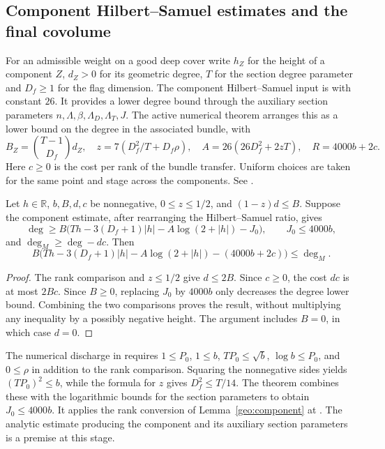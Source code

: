 \subsection{Component Hilbert--Samuel estimates and the final covolume}

For an admissible weight on a good deep cover write \(h_Z\) for the height of a component \(Z\), \(d_Z>0\) for its geometric degree, \(T\) for the section degree parameter and \(D_f\ge1\) for the flag dimension. The component Hilbert--Samuel input is  with constant \(26\). It provides a lower degree bound through the auxiliary section parameters \(n,\Lambda,\beta,\Lambda_D,\Lambda_T,J\). The active numerical theorem arranges this as a lower bound on the degree in the associated bundle, with
\[
 B_Z=\binom{T-1}{D_f}d_Z,\quad
 z=7(D_f^2/T+D_f\rho),\quad
 A=26(26D_f^2+2zT),\quad
 R=4000b+2c.
\]
Here \(c\ge0\) is the cost per rank of the bundle transfer. Uniform choices are taken for the same point and stage across the components. See .

\begin{lemma}\label{geo:component}
Let \(h\in\mathbb R\), \(b,B,d,c\) be nonnegative, \(0\le z\le1/2\), and \((1-z)d\le B\). Suppose the component estimate, after rearranging the Hilbert--Samuel ratio, gives
\[
 \deg\ge B\bigl(Th-3(D_f+1)|h|-A\log(2+|h|)-J_0\bigr),
 \qquad J_0\le4000b,
\]
and \(\deg_M\ge\deg-dc\). Then
\[
 B\bigl(Th-3(D_f+1)|h|-A\log(2+|h|)-(4000b+2c)\bigr)
 \le\deg_M .
\]
\end{lemma}
\begin{proof}
The rank comparison and \(z\le1/2\) give \(d\le2B\). Since \(c\ge0\), the cost \(dc\) is at most \(2Bc\). Since \(B\ge0\), replacing \(J_0\) by \(4000b\) only decreases the degree lower bound. Combining the two comparisons proves the result, without multiplying any inequality by a possibly negative height. The argument includes \(B=0\), in which case \(d=0\).
\end{proof}

The numerical discharge in  requires \(1\le P_0\), \(1\le b\), \(TP_0\le\sqrt b\), \(\log b\le P_0\), and \(0\le\rho\) in addition to the rank comparison. Squaring the nonnegative sides yields \((TP_0)^2\le b\), while the formula for \(z\) gives \(D_f^2\le T/14\). The theorem combines these with the logarithmic bounds for the section parameters to obtain \(J_0\le4000b\). It applies the rank conversion of Lemma~\ref{geo:component} at . The analytic estimate producing the component  and its auxiliary section parameters is a premise at this stage.

